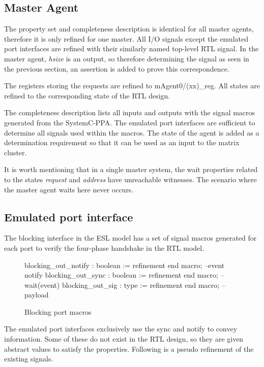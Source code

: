 \subsection{Master Agent}
The property set and completeness description is identical for all master agents, therefore it is only refined for one master. 
All I/O signals except the emulated port interfaces are refined with their similarly named top-level RTL signal. In the master agent, \textit{hsize} is an output, so therefore determining the signal as seen in the previous section, an assertion is added to prove this correspondence. \par
The registers storing the requests are refined to mAgent0/(xx)\_reg. All states are refined to the corresponding state of the RTL design.\par
The completeness description lists all inputs and outputs with the signal macros generated from the SystemC-PPA. The emulated port interfaces are sufficient to determine all signals used within the macros. The state of the agent is added as a determination requirement so that it can be used as an input to the matrix cluster. \par
It is worth mentioning that in a single master system, the wait properties related to the states \textit{request} and \textit{address} have unreachable witnesses. The scenario where the master agent waits here never occurs. 

\subsection{Emulated port interface}
\label{sub:em-port-refine}
The blocking interface in the ESL model has a set of signal macros generated for each port to verify the four-phase handshake in the RTL model.
\begin{figure}[h!]
\begin{VHI}
blocking_out_notify : boolean := refinement end macro; --event notify
blocking_out_sync : boolean := refinement end macro;   --wait(event)
blocking_out_sig : type := refinement end macro;       --payload
\end{VHI}
\caption{Blocking port macros}
\end{figure}

The emulated port interfaces exclusively use the sync and notify to convey information. Some of these do not exist in the RTL design, so they are given abstract values to satisfy the properties. Following is a pseudo refinement of the existing signals.

